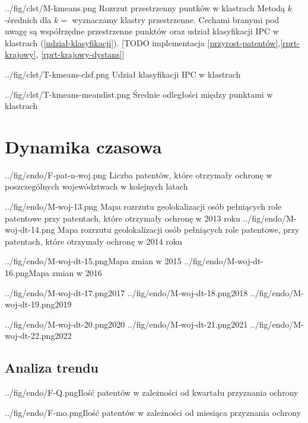   \figside
{../fig/clst/M-kmeans.png}
{Rozrzut przestrzenny puntków w klastrach}
{
Metodą $k$-średnich dla $k=$ wyznaczamy klastry przestrzenne. 
Cechami branymi pod uwagę są współrzędne przestrzenne punktów oraz
udział klasyfikacji \ac{IPC} w klastrach (\cref{udział-klasyfikacji}). 
[TODO implementacja \cref{przyrost-patentów},\cref{rprt-krajowy},
\cref{rprt-krajowy-dystans}]
}

\tblside
{../fig/clst/T-kmeans-clsf.png}
{Udział klasyfikacji \ac{IPC} w klastrach}

\tblside
{../fig/clst/T-kmeans-meandist.png}
{Średnie odległości między punktami w klastrach}




    \newpage\section{Dynamika czasowa}

  \figside
{../fig/endo/F-pat-n-woj.png}
{ Liczba patentów, które otrzymały ochronę w poszczególnych województwach 
  w kolejnych latach }

  \figsides
{../fig/endo/M-woj-13.png}
{ Mapa rozrzutu geolokalizacji osób pełniących role patentowe 
  przy patentach, które otrzymały ochronę w 2013 roku}
{../fig/endo/M-woj-dt-14.png}
{ Mapa rozrzutu geolokalizacji osób pełniących role patentowe, 
  przy patentach, które otrzymały ochronę w 2014 roku}

  \newpage\figsides
{../fig/endo/M-woj-dt-15.png}{Mapa zmian w 2015}
{../fig/endo/M-woj-dt-16.png}{Mapa zmian w 2016}

  \figsidesTri
{../fig/endo/M-woj-dt-17.png}{2017}
{../fig/endo/M-woj-dt-18.png}{2018}
{../fig/endo/M-woj-dt-19.png}{2019}

  \figsidesTri
{../fig/endo/M-woj-dt-20.png}{2020}
{../fig/endo/M-woj-dt-21.png}{2021}
{../fig/endo/M-woj-dt-22.png}{2022}






  \newpage\subsection
{Analiza trendu}



  \fig
{../fig/endo/F-Q.png}{Ilość patentów w zależności od kwartału przyznania ochrony}

  \fig
{../fig/endo/F-mo.png}{Ilość patentów w zależności od miesiąca przyznania ochrony}



